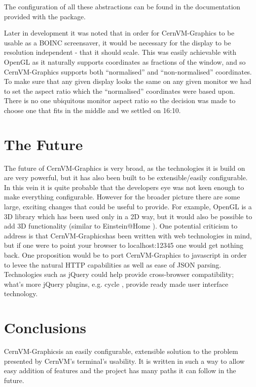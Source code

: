 \documentclass[twocolumn,aps]{revtex4}
\makeatletter
\newcommand{\cernvm}{CernVM}
\newcommand{\cernvmgraphics}{\cernvm{}-Graphics}
\newcommand{\boinc}{BOINC}
\newcommand{\opengl}{OpenGL}
\newcommand{\json}{JSON}
\newcommand{\vmport}{12345}
\newcommand{\einsteinathome}{Einstein@Home}
\newcommand{\jquery}{jQuery}
\makeatother
\begin{document}
    The configuration of all these abstractions can be found in the
    documentation provided with the package.
    
    Later in development it was noted that in order for \cernvmgraphics{} to
    be usable as a \boinc{} screensaver, it would be necessary for the
    display to be resolution independent - that it should scale. This was
    easily achievable with \opengl{} as it naturally supports coordinates as
    fractions of the window, and so \cernvmgraphics{} supports both
    ``normalised'' and ``non-normalised'' coordinates. To make sure that any
    given display looks the same on any given monitor we had to set the
    aspect ratio which the ``normalised'' coordinates were based upon.
    There is no one ubiquitous monitor aspect ratio so the decision was made
    to choose one that fits in the middle and we settled on 16:10.

  \section{ The Future }
    The future of \cernvmgraphics{} is very broad, as the technologies it is
    build on are very powerful, but it has also been built to be 
    extensible/easily configurable. In this vein it is quite probable that
    the developers eye was not keen enough to make everything configurable.
    However for the broader picture there are some large, exciting changes
    that could be useful to provide. For example, \opengl{} is a 3D library
    which has been used only in a 2D way, but it would also be possible to
    add 3D functionality (similar to \einsteinathome{} \cite{einsteinathome}
    ). One potential criticism to address is that \cernvmgraphics has been
    written with web technologies in mind, but if one were to point your
    browser to localhost:\vmport{} one would get nothing back. One
    proposition would be to port \cernvmgraphics{} to javascript in order to
    levee the natural HTTP capabilities as well as ease of \json{} parsing.
    Technologies such as \jquery{} \cite{jquery} could help provide 
    cross-browser compatibility; what's more \jquery{} plugins, e.g. cycle
    \cite{jquery-cycle}, provide ready made user interface technology.

  \section{ Conclusions }
    \cernvmgraphics is an easily configurable, extensible solution to the
    problem presented by \cernvm{}'s terminal's usability. It is written in
    such a way to allow easy addition of features and the project has many 
    paths it can follow in the future.
\end{document}

